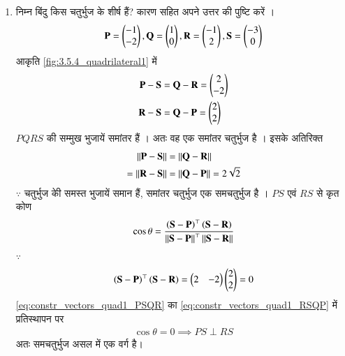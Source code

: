 \begin{enumerate}[label=\thesection.\arabic*.,ref=\thesection.\theenumi]


\item निम्न बिंदु किस चतुर्भुज के शीर्ष हैं? कारण सहित अपने उत्तर की पुष्टि करें ।
\begin{align}
\mathbf{P} = \begin{pmatrix}-1\\-2\end{pmatrix}, \mathbf{Q} =\begin{pmatrix}1\\0\end{pmatrix},
\mathbf{R} =\begin{pmatrix}-1\\2\end{pmatrix}, \mathbf{S} =\begin{pmatrix}-3\\0\end{pmatrix}
\end{align}
\solution
आकृति 	\ref{fig:3.5.4_quadrilateral1} में
\begin{align}
\label{eq:constr_vectors_quad1_PSQR}
 \mathbf{P} - \mathbf{S} &= 
 \mathbf{Q} - \mathbf{R} = \begin{pmatrix}2\\-2\end{pmatrix}
\\
\mathbf {R} - \mathbf {S} &=
 \mathbf {Q} - \mathbf {P} = \begin{pmatrix}2\\2\end{pmatrix}
\label{eq:constr_vectors_quad1_RSQP}
\end{align}
%
$PQRS$ की सम्मुख भुजायें  समांतर हैं । अतः वह एक समांतर चतुर्भुज है । इसके अतिरिक्त
\begin{align}
\left\lVert \mathbf{P} - \mathbf{S}\right\rVert &= 
\left\lVert \mathbf{Q} - \mathbf{R}\right\rVert 
\\
=\left\lVert\mathbf {R} - \mathbf {S}\right\rVert &=
\left\lVert \mathbf {Q} - \mathbf {P}\right\rVert = 2\sqrt{2}
\end{align}
%
$\because$ चतुर्भुज कीे समस्त भुजायें समान हैं, समांतर चतुर्भुज एक समचतुर्भुज है ।   $PS$ एवं
$RS$ से कृत कोण
\begin{align}
\cos \theta = \frac{\left(\mathbf{S}-\mathbf{P}\right)^{\top}\left(\mathbf{S}-\mathbf{R}\right)}{\left\lVert\mathbf{S}-\mathbf{P}\right\rVert^{\top}\left\lVert\mathbf{S}-\mathbf{R}\right\rVert}
\end{align}
%
$\because $
\begin{align}
\left(\mathbf{S}-\mathbf{P}\right)^{\top}\left(\mathbf{S}-\mathbf{R}\right) = \begin{pmatrix}2 & -2\end{pmatrix}\begin{pmatrix}2\\2\end{pmatrix} = 0
\end{align}
\eqref{eq:constr_vectors_quad1_PSQR} का  \eqref{eq:constr_vectors_quad1_RSQP} में प्रतिस्थापन पर
\begin{align}
\cos \theta = 0 \implies PS \perp RS
\end{align}
%
अतः समचतुर्भुज असल में एक वर्ग है। 
\begin{figure}[!ht]
	\centering

\end{figure}
\end{enumerate}
